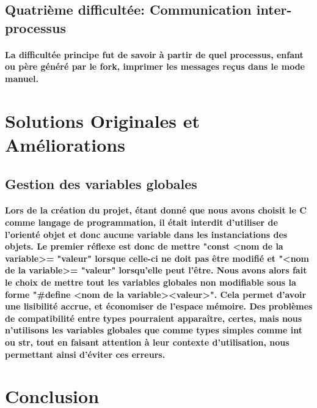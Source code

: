 \documentclass[utf8]{article}
\begin{document}
\subsection{Quatrième difficultée: Communication inter-processus}
\paragraph{ La difficultée principe fut de savoir à partir de quel processus, enfant ou père généré par le fork, imprimer les messages reçus dans le mode manuel.}



\section{Solutions Originales et Améliorations}
\subsection{Gestion des variables globales}
\paragraph{Lors de la création du projet, étant donné que nous avons choisit le C comme langage de programmation, il était interdit 
d'utiliser de l'orienté objet et donc aucune variable dans les instanciations des objets. Le premier réflexe est donc de mettre
"const \textless nom de la variable\textgreater  = "valeur" lorsque celle-ci ne doit pas être modifié et "\textless nom de la variable\textgreater = "valeur" lorsqu'elle 
peut l'être. Nous avons alors fait le choix de mettre tout les variables globales non modifiable sous la forme 
"\#define \textless nom de la variable\textgreater \textless valeur\textgreater". Cela permet d'avoir une lisibilité accrue, et économiser de l'espace mémoire. Des
problèmes de compatibilité entre types pourraient apparaître, certes, mais nous n'utilisons les variables globales que comme types simples comme int ou str, tout en
faisant attention à leur contexte d'utilisation, nous permettant ainsi d'éviter ces erreurs.}

\section{Conclusion}
\end{document}
